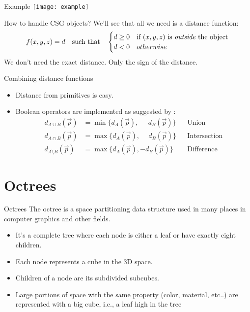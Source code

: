 \documentclass[utf8x]{beamer}
\begin{document}
\begin{frame}{Example}
\texttt{[image: example]}
\end{frame}

\begin{frame}{How to handle CSG objects?}
We'll see that all we need is a distance function:
\begin{equation}
f(x,y,z) = d\quad\text{such that}\quad
  \begin{cases}
    d \ge 0 & \text{if $(x,y,z)$ is \emph{outside} the object} \\
    d <   0 & otherwise
  \end{cases}
\end{equation}
We don't need the exact distance. Only the sign of the distance.
\end{frame}

\begin{frame}{Combining distance functions}
\begin{itemize}
\item Distance from primitives is easy.
\item Boolean operators are implemented as suggested by \cite{Persson2005}:
      \begin{align}
        d_{A \cup      B}(\vec{p})  &= \min \{d_A(\vec{p}), 
                                              \phantom{-}\, d_B(\vec{p})
                                            \} 
                                    && \text{Union} \\
        d_{A \cap      B}(\vec{p})  &= \max \{d_A(\vec{p}), 
                                              \phantom{-} d_B(\vec{p})
                                            \}
                                    && \text{Intersection} \\
        d_{A \setminus B}(\vec{p})  &= \max \{d_A(\vec{p}), 
                                              - d_B(\vec{p})
                                            \} 
                                    && \text{Difference}
      \end{align}
\end{itemize}
\end{frame}

\section{Octrees}
\begin{frame}{Octrees}
The octree is a space partitioning data structure used in many places in 
computer graphics and other fields.
\begin{itemize}
\item It's a complete tree where each node is either a leaf or have exactly 
      eight children.
\item Each node represents a cube in the 3D space.
\item Children of a node are its subdivided subcubes.
\item Large portions of space with the same property (color, material, etc..) 
      are represented with a big cube, i.e., a leaf high in the tree
\end{itemize}
\end{frame}
\end{document}

